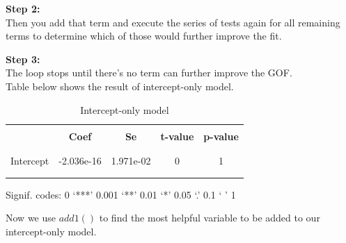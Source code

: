 \documentclass[12pt]{article}
\begin{document}
{\textbf {Step 2:}}\\
Then you add that term and execute the series of tests again for
all remaining terms to determine which of those would further improve
the fit.

{\textbf {Step 3:}}\\
The loop stops until there's no term can further improve the GOF.\\



Table below shows the result of intercept-only model. 


\begin{table}[h!]
\begin{center}
	
\begin{threeparttable}
		\caption{Intercept-only model}			
\begin{tabular}{ccccc}
\\ [-1.8ex]
\hline
\hline

\hline \\[-1.8ex]
 & {\textbf {Coef}} & {\textbf {Se}} &{\textbf {t-value}}&{\textbf {p-value}} \\
\\ [-1.8ex]
\hline \\[-1.8ex]


Intercept &-2.036e-16  &1.971e-02       &0        &1\\



\\ [-1.8ex]
\hline \\[-1.8ex]

\end{tabular}
\begin{tablenotes}
\small
\item Signif. codes:  0 ‘***’ 0.001 ‘**’ 0.01 ‘*’ 0.05 ‘.’ 0.1 ‘ ’ 1
\end{tablenotes}

\end{threeparttable}
\end{center}
\end{table}




Now we use $ add1() $ to find the most helpful variable to be added to
our intercept-only model.
\end{document}
